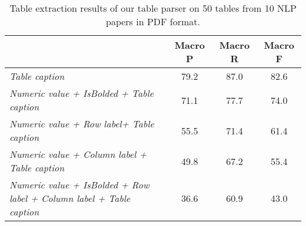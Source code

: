 \documentclass[11pt,a4paper]{article}
\begin{document}
\begin{table*}[t]
\begin{center}
\begin{small}
\begin{tabular}{lccc}
\hline
&Macro P&Macro R&Macro F\\ \hline
\emph{Table caption}&79.2&87.0&82.6 \\
\emph{Numeric value +  IsBolded + Table caption}&71.1&77.7&74.0 \\
\emph{Numeric value +  Row label+ Table caption}&55.5&71.4&61.4 \\
\emph{Numeric value  + Column label + Table caption}&49.8&67.2&55.4 \\
\emph{Numeric value + IsBolded + Row label + Column label + Table caption }&36.6&60.9&43.0 \\
 \hline
\end{tabular}
\end{small}
\end{center}
\caption{\label{tab:tableExt}  Table extraction results of our table parser on 50 tables from 10 NLP papers in PDF format.}
\end{table*}
\end{document}
